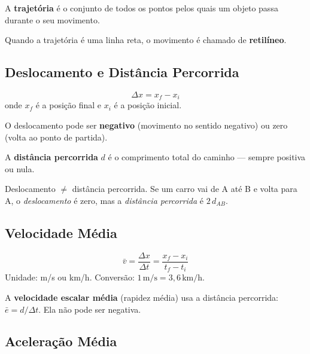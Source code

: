 \documentclass[12pt,a4paper]{article}
\begin{document}
\begin{tcolorbox}[defbox={Defini\c{c}\~ao: Trajet\'oria}]
  A \textbf{trajet\'oria} \'e o conjunto de todos os pontos pelos quais um objeto
  passa durante o seu movimento.
\end{tcolorbox}

Quando a trajet\'oria \'e uma linha reta, o movimento \'e chamado de
\textbf{retil\'ineo}.

\subsection{Deslocamento e Dist\^ancia Percorrida}

\begin{tcolorbox}[formulabox={Deslocamento}]
  \[
    \Delta x = x_f - x_i
  \]
  onde $x_f$ \'e a posi\c{c}\~ao final e $x_i$ \'e a posi\c{c}\~ao inicial.
\end{tcolorbox}

O deslocamento pode ser \textbf{negativo} (movimento no sentido negativo) ou zero
(volta ao ponto de partida).

A \textbf{dist\^ancia percorrida} $d$ \'e o comprimento total do caminho ---
sempre positiva ou nula.

\begin{tcolorbox}[atencaobox]
  Deslocamento $\boldsymbol{\neq}$ dist\^ancia percorrida. Se um carro vai de A
  at\'e B e volta para A, o \emph{deslocamento} \'e zero, mas a
  \emph{dist\^ancia percorrida} \'e $2\,d_{AB}$.
\end{tcolorbox}

\subsection{Velocidade M\'edia}

\begin{tcolorbox}[formulabox={Velocidade M\'edia}]
  \[
    \bar{v} = \frac{\Delta x}{\Delta t} = \frac{x_f - x_i}{t_f - t_i}
  \]
  Unidade: m/s ou km/h.\quad
  Convers\~ao: $1\,\text{m/s} = 3{,}6\,\text{km/h}$.
\end{tcolorbox}

A \textbf{velocidade escalar m\'edia} (rapidez m\'edia) usa a dist\^ancia percorrida:
$\bar{e} = d / \Delta t$. Ela n\~ao pode ser negativa.

\subsection{Acelera\c{c}\~ao M\'edia}
\end{document}
